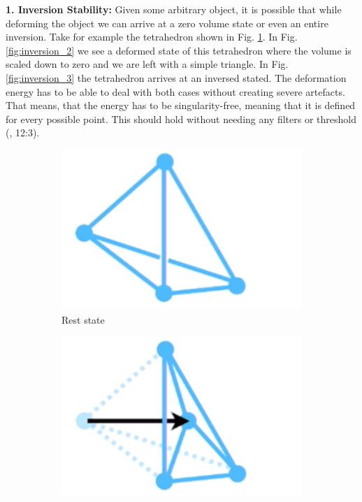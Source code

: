\textbf{1. Inversion Stability:} Given some arbitrary object, it is possible that while deforming the object we can arrive at a zero volume state or even an entire inversion. Take for example the tetrahedron shown in Fig. \ref{fig:inversion_1}. In Fig. \ref{fig:inversion_2} we see a deformed state of this tetrahedron where the volume is scaled down to zero and we are left with a simple triangle. In Fig. \ref{fig:inversion_3} the tetrahedron arrives at an inversed stated. The deformation energy has to be able to deal with both cases without creating severe artefacts. That means, that the energy has to be singularity-free, meaning that it is defined for every possible point. This should hold without needing any filters or threshold (\cite{Smith:2018:SNF:3191713.3180491}, 12:3).

\begin{figure}[!ht]
\centering
\begin{subfigure}{.3\textwidth}
  \centering
  \includegraphics[width=.8\linewidth]{resources/inversion_1}  
  \caption{Rest state}
  \label{fig:inversion_1}
\end{subfigure}
\begin{subfigure}{.3\textwidth}
  \centering
  \includegraphics[width=.8\linewidth]{resources/inversion_2}  

\end{subfigure}
\end{figure}
